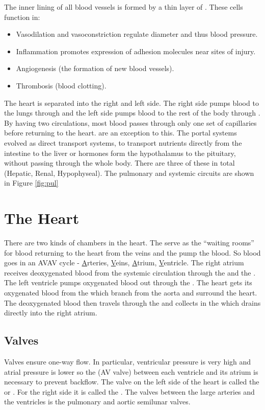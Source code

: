 \documentclass[../Bio_chemistryReview.tex]{subfiles}
\begin{document}
The inner lining of all blood vessels is formed by a thin layer of
. These cells function in:
\begin{itemize}
  \item Vasodilation and vasoconstriction regulate diameter and thus blood
    pressure.
  \item Inflammation promotes expression of adhesion molecules near sites of
    injury.
  \item Angiogenesis (the formation of new blood vessels).
  \item Thrombosis (blood clotting).
\end{itemize}
The heart is separated into the right and left side. The right side pumps blood
to the lungs through  and the left side pumps
blood to the rest of the body through . By having
two circulations, most blood passes through only one set of capillaries before
returning to the heart.  are an exception to this. The
portal systems evolved as direct transport systems, to transport nutrients
directly from the intestine to the liver or hormones form the hypothalamus to
the pituitary, without passing through the whole body. There are three of these
in total (Hepatic, Renal, Hypophyseal).
The pulmonary and systemic circuits are shown in Figure \ref{fig:pul}

\section{The Heart}
There are two kinds of chambers in the heart. The  serve as the
``waiting rooms'' for blood returning to the heart from the veins and the
 pump the blood. So blood goes in an AVAV cycle -
\ul{A}rteries, \ul{V}eins, \ul{A}trium, \ul{V}entricle. The right atrium
receives deoxygenated blood from the systemic circulation through the
 and the . The left
ventricle pumps oxygenated blood out through the . The heart gets
its oxygenated blood from the  which branch from the
aorta and surround the heart. The deoxygenated blood then travels through the
 and collects in the  which
drains directly into the right atrium.

\subsection{Valves}
Valves ensure one-way flow. In particular, ventricular pressure is very high and
atrial pressure is lower so the  (AV valve)
between each ventricle and its atrium is necessary to prevent backflow. The
valve on the left side of the heart is called the  or
. For the right side it is called the . The valves between the large arteries and the ventricles is the
pulmonary and aortic semilunar valves.
\end{document}
